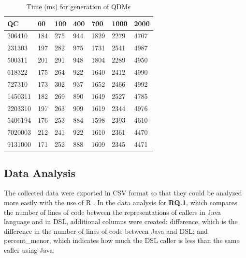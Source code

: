 \begin{table}[htb!]
\centering
\caption{Time (ms) for generation of QDMs}
\label{table:tempo}
\begin{center}
\begin{tabular}{lllllll}
\toprule
\textbf{QC}      & \textbf{60}  & \textbf{100} & \textbf{400}  & \textbf{700}  & \textbf{1000} & \textbf{2000} \\ \midrule

206410  & 184 & 275 & 944  & 1829 & 2279 & 4707 \\ %
231303  & 197 & 282 & 975  & 1731 & 2541 & 4987 \\ %
500311  & 201 & 291 & 948  & 1804 & 2289 & 4950 \\ %
618322  & 175 & 264 & 922  & 1640 & 2412 & 4990 \\ %
727310  & 173 & 302 & 937  & 1652 & 2466 & 4992 \\ %
1450311 & 182 & 269 & 890  & 1649 & 2527 & 4785 \\ %
2203310 & 197 & 263 & 909  & 1619 & 2344 & 4976 \\ %
5406194 & 176 & 253 & 884  & 1598 & 2393 & 4610 \\ %
7020003 & 212 & 241 & 922  & 1610 & 2361 & 4470 \\ %
9131000 & 171 & 252 & 888  & 1609 & 2345 & 4471 \\ \bottomrule
\end{tabular}
\end{center}
\end{table}

\subsection{Data Analysis}


The collected data were exported in CSV format so that they could be analyzed more easily with the use of R \cite{crawley2013}. In the data analysis for \textbf{RQ.1}, which compares the number of lines of code between the representations of callers in Java language and in DSL, additional columns were created: difference, which is the difference in the number of lines of code between Java and DSL; and percent\_menor, which indicates how much the DSL caller is less than the same caller using Java.

